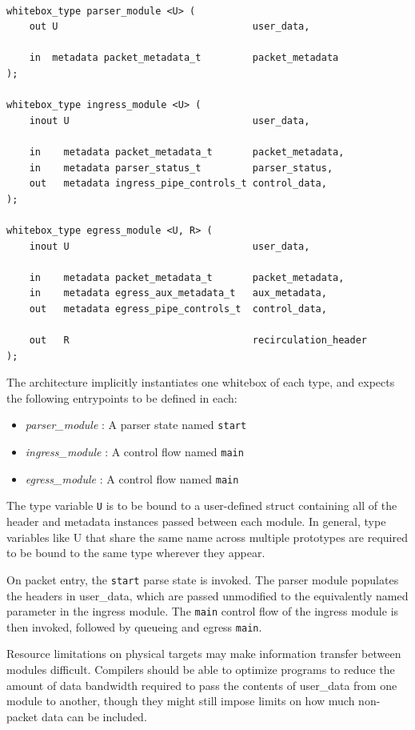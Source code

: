 \documentclass[12pt]{article}
\begin{document}
\begin{lstlisting}[style=P4style]

whitebox_type parser_module <U> (
    out U                                  user_data,

    in  metadata packet_metadata_t         packet_metadata
);

whitebox_type ingress_module <U> (
    inout U                                user_data,

    in    metadata packet_metadata_t       packet_metadata,
    in    metadata parser_status_t         parser_status,
    out   metadata ingress_pipe_controls_t control_data,
);

whitebox_type egress_module <U, R> (
    inout U                                user_data,

    in    metadata packet_metadata_t       packet_metadata,
    in    metadata egress_aux_metadata_t   aux_metadata,
    out   metadata egress_pipe_controls_t  control_data,

    out   R                                recirculation_header
);

\end{lstlisting}

The architecture implicitly instantiates one whitebox of each type, and expects
the following entrypoints to be defined in each:
\begin{itemize}
\item
\textit{parser_module} : A parser state named \texttt{start}
\item
\textit{ingress_module} : A control flow named \texttt{main}
\item
\textit{egress_module} : A control flow named \texttt{main}
\end{itemize}

The type variable \texttt{U} is to be bound to a user-defined struct containing
all of the header and metadata instances passed between each module. In general,
type variables like U that share the same name across multiple prototypes are
required to be bound to the same type wherever they appear.

On packet entry, the \texttt{start} parse state is invoked. The parser module
populates the headers in user_data, which are passed unmodified to the
equivalently named parameter in the ingress module. The \texttt{main} control
flow of the ingress module is then invoked, followed by queueing and egress 
\texttt{main}.

Resource limitations on physical targets may make information transfer between
modules difficult. Compilers should be able to optimize programs to reduce the
amount of data bandwidth required to pass the contents of user_data from one
module to another, though they might still impose limits on how much non-packet
data can be included.
\end{document}
